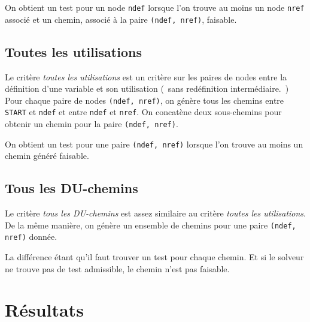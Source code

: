 On obtient un test pour un node \texttt{ndef} lorsque l'on trouve au moins un
node \texttt{nref} associé et un chemin, associé à la paire
\texttt{(ndef, nref)}, faisable.

\subsection{Toutes les utilisations}

Le critère \textit{toutes les utilisations} est un critère sur les paires de
nodes entre la définition d'une variable et son utilisation (~sans redéfinition
intermédiaire.~) Pour chaque paire de nodes \texttt{(ndef, nref)}, on génère
tous les chemins entre \texttt{START} et \texttt{ndef} et entre \texttt{ndef}
et \texttt{nref}. On concatène deux sous-chemins pour obtenir un chemin pour la
paire \texttt{(ndef, nref)}.

On obtient un test pour une paire \texttt{(ndef, nref)} lorsque l'on trouve au
moins un chemin généré faisable.

\subsection{Tous les DU-chemins}

Le critère \textit{tous les DU-chemins} est assez similaire au critère
\textit{toutes les utilisations}. De la même manière, on génère un ensemble de
chemins pour une paire \texttt{(ndef, nref)} donnée.

La différence étant qu'il faut trouver un test pour chaque chemin. Et si le
solveur ne trouve pas de test admissible, le chemin n'est pas faisable.

\section{Résultats}

